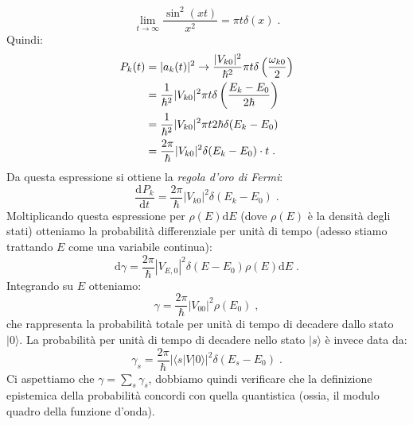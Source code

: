 \documentclass[12pt,a4paper]{report}
\theoremstyle{definition}
\newcommand{\dev}[3][]{\frac{\mathrm{d}^{#1} #2}{\mathrm{d} #3^{#1}}}
\numberwithin{equation}{section}
\newcommand{\diff}[1][]{\mathrm{d}#1}
\newcommand{\bra}{\langle}
\newcommand{\ket}{\rangle}
\begin{document}
\begin{equation}
\lim_{t\to\infty}\frac{\sin^2(xt)}{x^2}=\pi t\delta(x)\;.
\end{equation}
Quindi:
\begin{align}
P_k(t)&=|a_k(t)|^2\to \frac{|V_{k0}|^2}{\hbar^2}\pi t\delta\left(\frac{\omega_{k0}}{2}\right) \notag \\
&=\frac{1}{\hbar^2}|V_{k0}|^2\pi t\delta\left(\frac{E_k-E_0}{2\hbar}\right) \notag \\
&= \frac{1}{\hbar^2}|V_{k0}|^2\pi t 2\hbar\delta(E_k-E_0) \notag \\
&=\frac{2\pi}{\hbar}|V_{k0}|^2\delta(E_k-E_0) \cdot t\;.
\end{align}
Da questa espressione si ottiene la \textit{regola d'oro di Fermi}:
\begin{equation}
\dev{P_k}{t}=\frac{2\pi}{\hbar}|V_{k0}|^2\delta(E_k-E_0)\;.
\end{equation}
Moltiplicando questa espressione per $\rho(E)\diff{E}$ (dove $\rho(E)$ è la densità degli stati) otteniamo la probabilità differenziale per unità di tempo (adesso stiamo trattando $E$ come una variabile continua):
\begin{equation}
\diff{\gamma}=\frac{2\pi}{\hbar}|V_{E,0}|^2\delta(E-E_0)\rho(E)\diff{E}\;.
\end{equation}
Integrando su $E$ otteniamo:
\begin{equation}
\gamma=\frac{2\pi}{\hbar}|V_{00}|^2\rho(E_0)\;,
\end{equation}
che rappresenta la probabilità totale per unità di tempo di decadere dallo stato $|0\ket$. La probabilità per unità di tempo di decadere nello stato $|s\ket$ è invece data da:
\begin{equation}
\gamma_s=\frac{2\pi}{\hbar}|\bra s|V|0\ket|^2\delta(E_s-E_0)\;.
\end{equation}
Ci aspettiamo che $\gamma=\sum_s \gamma_s$, dobbiamo quindi verificare che la definizione epistemica della probabilità concordi con quella quantistica (ossia, il modulo quadro della funzione d'onda).
\end{document}
